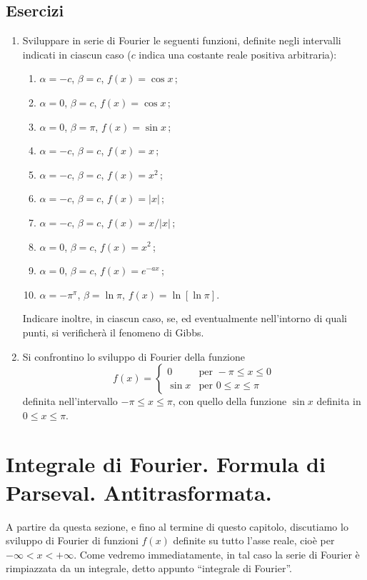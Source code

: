 \documentclass[11pt, a4paper]{book}
\numberwithin{equation}{section}
\newenvironment{esercizi}{\subsection*{Esercizi}\begin{enumerate}}{\end{enumerate}}
\begin{document}
\begin{esercizi}
\item Sviluppare in serie di Fourier le seguenti funzioni, definite negli intervalli indicati in ciascun caso ($c$ indica una costante reale positiva arbitraria):
\begin{enumerate}
  \item $\alpha=-c$, $\beta=c$, $f(x)=\cos x$\,;
  \item $\alpha=0$, $\beta=c$, $f(x)=\cos x$\,;
  \item $\alpha=0$, $\beta=\pi$, $f(x)=\sin x$\,;
  \item $\alpha=-c$, $\beta=c$, $f(x)=x$\,;
  \item $\alpha=-c$, $\beta=c$, $f(x)=x^2$\,;
  \item $\alpha=-c$, $\beta=c$, $f(x)=|x|$\,;
  \item $\alpha=-c$, $\beta=c$, $f(x)=x/|x|$\,;
  \item $\alpha=0$, $\beta=c$, $f(x)=x^2$\,;
  \item $\alpha=0$, $\beta=c$, $f(x)=e^{-ax}$\,;
  \item $\alpha=-\pi^{\pi}$, $\beta=\ln\pi$, $f(x)=\ln[\ln\pi]$.
\end{enumerate}
Indicare inoltre, in ciascun caso, se, ed eventualmente nell'intorno di quali punti, si verificherà il fenomeno di Gibbs.

\item Si confrontino lo sviluppo di Fourier della funzione
\[
  f(x) = \begin{cases} 0 & \text{per } -\pi \leq x \leq 0 \\ \sin x & \text{per } 0 \leq x \leq \pi \end{cases}
\]
definita nell'intervallo $-\pi \leq x \leq \pi$, con quello della funzione $\sin x$ definita in $0 \leq x \leq \pi$.
\end{esercizi}

\section{Integrale di Fourier. Formula di Parseval. Antitrasformata.}

A partire da questa sezione, e fino al termine di questo capitolo, discutiamo lo sviluppo di Fourier di funzioni $f(x)$ definite su tutto l'asse reale, cioè per $-\infty < x < +\infty$. Come vedremo immediatamente, in tal caso la serie di Fourier è rimpiazzata da un integrale, detto appunto ``integrale di Fourier''.
\end{document}
